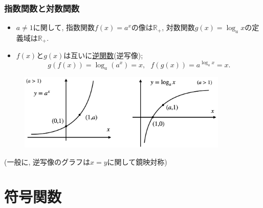 \documentclass[dvipdfmx,cjk,10.2pt]{beamer}
\newcommand{\R}{\mathbb{R}}
\theoremstyle{definition}
\begin{document}
\begin{frame}
\frametitle{指数関数と対数関数}   

\begin{itemize}
\item $a \ne 1$に関して, 指数関数$f(x)=a^x$の像は$\R_+$, 対数関数$g(x)=\log_ax$の定義域は$\R_+$. 
\item $f(x)$と$g(x)$は互いに\underline{逆関数}(逆写像);  
$$
g(f(x))=\log_a(a^x)=x, \ \ \ f(g(x))=a^{\log_ax}=x. 
$$
\end{itemize}

\vspace{-1mm}

\begin{figure}[htbp]
 \begin{center} 
  \includegraphics[width=100mm]{exp_log.png}
 \end{center}
\end{figure}
\vspace{-4mm}

(一般に, 逆写像のグラフは$x=y$に関して鏡映対称)

\end{frame}



\section{符号関数}
\end{document}
